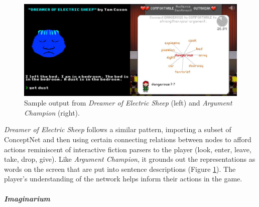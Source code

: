 
\begin{figure}
    \centering
    \includegraphics[width=\textwidth]{figures/4-Delve/androids-sheep.png}
    \caption{Sample output from \textit{Dreamer of Electric Sheep} (left) and \textit{Argument Champion} (right).}
    \label{fig:dreamer-of-electric-sheep}
\end{figure}


\textit{Dreamer of Electric Sheep} follows a similar pattern, importing a subset of ConceptNet and then using certain connecting relations between nodes to afford actions reminiscent of interactive fiction parsers to the player (look, enter, leave, take, drop, give). Like \textit{Argument Champion}, it grounds out the representations as words on the screen that are put into sentence descriptions (Figure \ref{fig:dreamer-of-electric-sheep}). The player’s understanding of the network helps inform their actions in the game.

\paragraph{\textit{Imaginarium}}\label{par:imaginarium}

